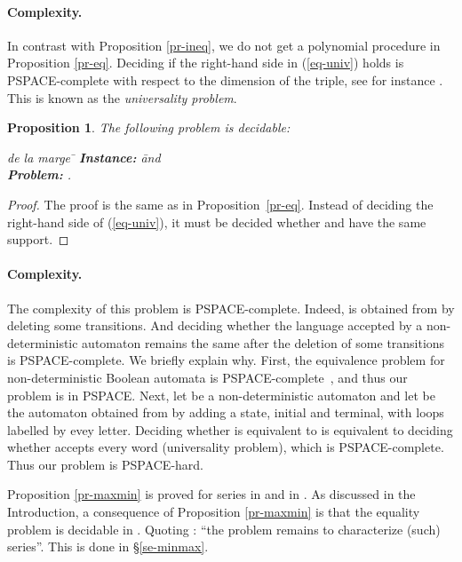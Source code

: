 \documentclass{article}
\newtheorem{prpstn}[thrm]{Proposition}
\newcommand{\1}{\mathbb{1}}
\newcommand{\0}{\mathbb{0}}
\begin{document}
\paragraph{Complexity.}
In contrast with Proposition \ref{pr-ineq}, we do not get a polynomial
procedure in Proposition \ref{pr-eq}. 
Deciding if the right-hand side in (\ref{eq-univ}) holds is PSPACE-complete with respect to the
dimension of the triple, see for instance \cite[Theorem 13.14 and
  Exercise 13.25]{HoUl}.  This is known as 
the {\em universality problem}.


\begin{prpstn}
\label{pr-eq-part}
The following problem is decidable:
\begin{tabbing} 
de la marge \= \kill
\> {\bf Instance:} \hspace*{0.4cm} \=  and
 \\
\>  {\bf Problem:} \> \;.
\end{tabbing}
\end{prpstn}
\begin{proof}
The proof is the same as in Proposition~\ref{pr-eq}.
Instead of deciding the right-hand side of (\ref{eq-univ}), it must be decided whether
 and 
have the same support.
\end{proof}

\paragraph{Complexity.}
The complexity of this problem is PSPACE-complete. 
Indeed,  is obtained
from  by deleting some transitions. 
And deciding whether the language accepted by a non-deterministic automaton
remains the same after the deletion of some transitions is
PSPACE-complete. We briefly explain why. 
First, the equivalence problem for non-deterministic Boolean automata
is PSPACE-complete~\cite{StMe},
and thus our problem is in PSPACE.
Next, let  be a non-deterministic automaton and
let  be the automaton obtained from 
by adding a state, initial and terminal, with loops labelled by evey letter.
Deciding whether  is equivalent to  is equivalent
to deciding whether  accepts every word (universality problem),
which is PSPACE-complete.
Thus our problem is PSPACE-hard.

\medskip

Proposition \ref{pr-maxmin} is proved for series in
 and  in
\cite[Proposition 5.3]{krob94}. As discussed in the Introduction, a
consequence of Proposition \ref{pr-maxmin} is that the equality problem is decidable in
. Quoting
\cite{krob94}: ``the problem remains to characterize (such)
series''. This is done in \S \ref{se-minmax}. 
\end{document}
